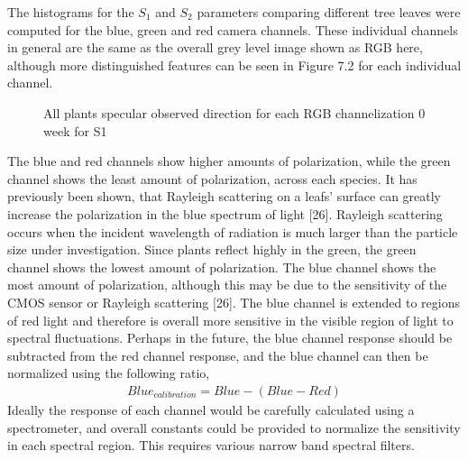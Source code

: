 The histograms for the $S_1$ and $S_2$ parameters comparing different tree leaves were computed for the blue, green and red camera channels.  These individual channels in general are the same as the overall grey level image shown as RGB here, although more distinguished features can be seen in Figure 7.2 for each individual channel.
%
\begin{sidewaysfigure}
    \begin{center}
    \end{center}
    \caption{All plants specular observed direction for each RGB channelization 0 week for S1}
    \label{fig:polarization}
\end{sidewaysfigure}
%
%
The blue and red channels show higher amounts of polarization, while the green channel shows the least amount of polarization, across each species.  It has previously been shown, that Rayleigh scattering on a leafs' surface can greatly increase the polarization in the blue spectrum of light [26]. Rayleigh scattering occurs when the incident wavelength of radiation is much larger than the particle size under investigation.  Since plants reflect highly in the green, the green channel shows the lowest amount of polarization.  The blue channel shows the most amount of polarization, although this may be due to the sensitivity of the CMOS sensor or Rayleigh scattering [26].  The blue channel is extended to regions of red light and therefore is overall more sensitive in the visible region of light to spectral fluctuations.  Perhaps in the future, the blue channel response should be subtracted from the red channel response, and the blue channel can then be normalized using the following ratio,
%
\begin{align}
    Blue_{calibration} = Blue - (Blue - Red)
\end{align}
%
Ideally the response of each channel would be carefully calculated using a spectrometer, and overall constants could be provided to normalize the sensitivity in each spectral region.  This requires various narrow band spectral filters.

